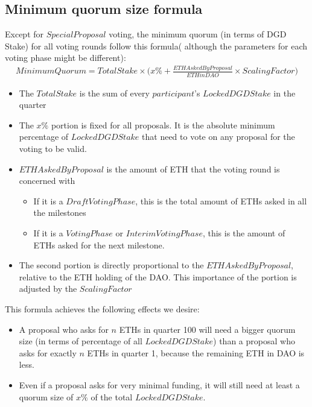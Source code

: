 \documentclass[11pt,a4paper,titlepage]{article}
\begin{document}
{	\subsection{Minimum quorum size formula}{
		Except for $Special Proposal$ voting, the minimum quorum (in terms of DGD Stake) for all voting rounds  follow this formula( although the parameters for each voting phase might be different):
		\begin{align*}
			Minimum Quorum =
			TotalStake \times \Bigg(x\% + \frac{ETH Asked By Proposal}{ETH in DAO} \times Scaling Factor \Bigg)
		\end{align*}
		\begin{itemize}
			\item The $TotalStake$ is the sum of every $participant$'s $Locked DGD Stake$ in the quarter
			\item The $x\%$ portion is fixed for all proposals. It is the absolute minimum percentage of $Locked DGD Stake$ that need to vote on any proposal for the voting to be valid.
			\item $ETH Asked By Proposal$ is the amount of ETH that the voting round is concerned with
			\begin{itemize}
				\item If it is a $Draft Voting Phase$, this is the total amount of ETHs asked in all the milestones
				\item If it is a $Voting Phase$ or $Interim Voting Phase$, this is the amount of ETHs asked for the next milestone.
			\end{itemize}
			\item The second portion is directly proportional to the $ETH Asked By Proposal$, relative to the ETH holding of the DAO. This importance of the portion is adjusted by the $Scaling Factor$
		\end{itemize}
		This formula achieves the following effects we desire:
		\begin{itemize}
			\item A proposal who asks for $n$ ETHs in quarter 100 will need a bigger quorum size (in terms of percentage of all $Locked DGD Stake$) than a proposal who asks for exactly $n$ ETHs in quarter 1, because the remaining ETH in DAO is less.
			\item Even if a proposal asks for very minimal funding, it will still need at least a quorum size of $x\%$ of the total $Locked DGD Stake$.
		\end{itemize}
	}
}
\end{document}
